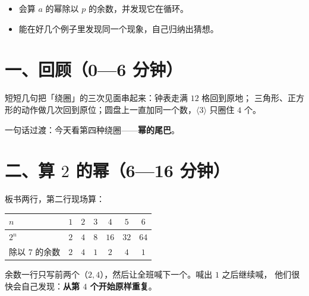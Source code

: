 

\begin{mubiao}
  \begin{itemize}
    \item 会算 \(a\) 的幂除以 \(p\) 的余数，并发现它在循环。
    \item 能在好几个例子里发现同一个现象，自己归纳出猜想。
  \end{itemize}
\end{mubiao}


\section*{一、回顾（0—6 分钟）}

短短几句把「绕圈」的三次见面串起来：钟表走满 \(12\) 格回到原地；
三角形、正方形的动作做几次回到原位；圆盘上一直加同一个数，\(\langle3\rangle\) 只圈住 \(4\) 个。

一句话过渡：今天看第四种绕圈——\textbf{幂的尾巴}。

\section*{二、算 \(2\) 的幂（6—16 分钟）}

板书两行，第二行现场算：

\begin{center}
\begin{tabular}{@{}lcccccc@{}}
  \toprule
  \(n\) & \(1\) & \(2\) & \(3\) & \(4\) & \(5\) & \(6\) \\
  \midrule
  \(2^n\) & \(2\) & \(4\) & \(8\) & \(16\) & \(32\) & \(64\) \\
  除以 \(7\) 的余数 & \(2\) & \(4\) & \(1\) & \(2\) & \(4\) & \(1\) \\
  \bottomrule
\end{tabular}
\end{center}

\begin{caozuo}
  余数一行只写前两个（\(2,4\)），然后让全班喊下一个。喊出 \(1\) 之后继续喊，
  他们很快会自己发现：\textbf{从第 \(4\) 个开始原样重复}。
\end{caozuo}


